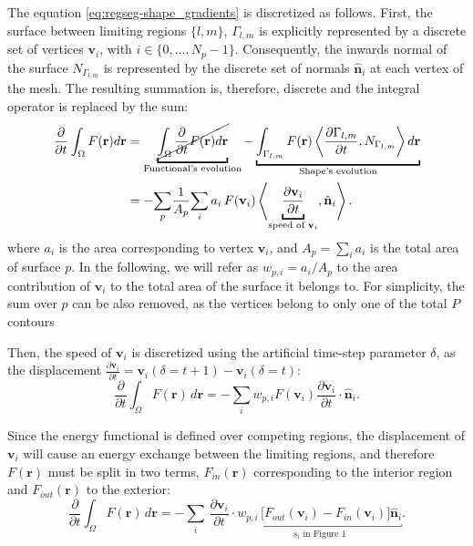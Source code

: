 \documentclass[a4paper]{report}
\renewcommand{\vec}[1]{\mathbf{#1}}
\begin{document}
The equation \eqref{eq:regseg-shape_gradients} is discretized as follows.
First, the surface between limiting regions $\{l, m\}$, $\Gamma_{l,m}$ is explicitly represented by
  a discrete set of vertices $\vec{v}_i$, with $i \in \{0, \ldots, N_p -1 \}$.
Consequently, the inwards normal of the surface $N_{\Gamma_{l,m}}$ is represented by the discrete
  set of normals $\hat{\vec{n}}_i$ at each vertex of the mesh.
The resulting summation is, therefore, discrete and the integral operator is replaced by the sum:
  \begin{align}
  \frac{\partial}{\partial t} \int_\Omega F(\vec{r}) d\vec{r} &=
  \underbracket{\cancel{\int_\Omega \frac{\partial}{\partial t}F(\vec{r}) d\vec{r} }}_{\text{Functional's evolution}}
  - \underbracket{\int_{\Gamma_{l,m}} F(\vec{r}) \left\langle \frac{\partial \Gamma_{l,m}}{\partial t},
  N_{\Gamma_{l,m}}\right\rangle d\vec{r}}_{\text{Shape's evolution}} \notag \\
  & = - \underset{p}{\sum} \frac{1}{A_p} \underset{i}{\sum} \, a_i \, F(\vec{v}_i) \left\langle \underbracket{\frac{\partial \vec{v}_i}{\partial t}}_{\text{speed of }\vec{v}_i},
  \hat{\vec{n}}_{i}\right\rangle.
  \label{eq:regseg-shape_gradient_orig}
  \end{align}
where $a_i$ is the area corresponding to vertex $\vec{v}_i$, and $A_p = \sum_i a_i$ is the total area of surface $p$.
In the following, we will refer as $w_{p,i} = a_i / A_p $ to the area contribution of $\vec{v}_i$ to the
  total area of the surface it belongs to.
For simplicity, the sum over $p$ can be also removed, as the vertices belong to only one of the total $P$ contours

Then, the speed of $\vec{v}_i$ is discretized using the artificial time-step parameter $\delta$, as the displacement
  $\frac{\partial \vec{v}_i}{\partial t} = \vec{v}_i(\delta = t+1) - \vec{v}_i(\delta = t)$:
  \begin{equation}
  \frac{\partial}{\partial t} \int_\Omega F(\vec{r}) \, d\vec{r} =
  - \underset{i}{\sum} w_{p,i} F(\vec{v}_i) \frac{\partial \vec{v}_i}{\partial t} \cdot \hat{\vec{n}}_i.
  \label{eq:regseg-shape_gradient_disc1}
  \end{equation}

Since the energy functional is defined over competing regions, the displacement of $\vec{v}_i$ will cause
  an energy exchange between the limiting regions, and therefore $F(\vec{r})$ must be split in
  two terms, $F_{in}(\vec{r})$ corresponding to the interior region and $F_{out}(\vec{r})$ to the exterior:
  \begin{equation}
  \frac{\partial}{\partial t} \int_\Omega F(\vec{r}) \, d\vec{r} =
  - \underset{i}{\sum} \, \frac{\partial \vec{v}_i}{\partial t} \cdot
  \underbracket{w_{p,i} \, \Big[ F_{out}(\vec{v}_i) - F_{in}(\vec{v}_i) \Big] \hat{\vec{n}}_i}_{\bar{s}_i \text{ in Figure 1}}.
  \label{eq:regseg-shape_gradient_disc2}
  \end{equation}
\end{document}
